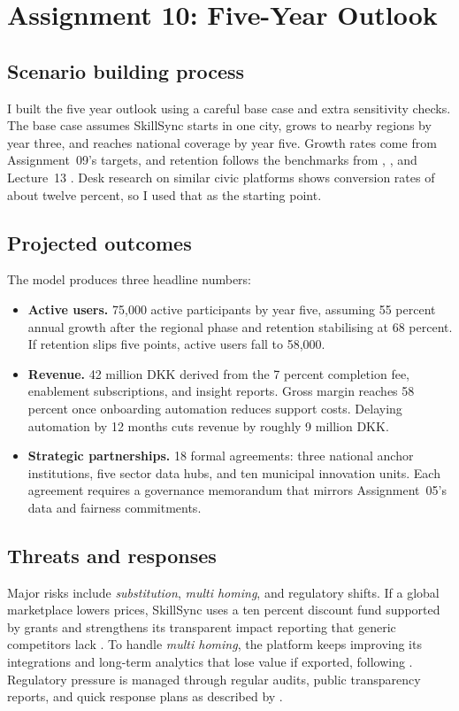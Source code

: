\section*{Assignment 10: Five-Year Outlook}

\subsection*{Scenario building process}
I built the five year outlook using a careful base case and extra sensitivity checks. The base case assumes SkillSync starts in one city, grows to nearby regions by year three, and reaches national coverage by year five. Growth rates come from Assignment~09’s targets, and retention follows the benchmarks from \citet{Choudary2016}, \citet{Srnicek2017}, and Lecture~13 \citep{Lecture13}. Desk research on similar civic platforms shows conversion rates of about twelve percent, so I used that as the starting point.

\subsection*{Projected outcomes}
The model produces three headline numbers:
\begin{itemize}

\item \textbf{Active users.} 75,000 active participants by year five, assuming 55 percent annual growth after the regional phase and retention stabilising at 68 percent. If retention slips five points, active users fall to 58,000.

\item \textbf{Revenue.} 42 million DKK derived from the 7 percent completion fee, enablement subscriptions, and insight reports. Gross margin reaches 58 percent once onboarding automation reduces support costs. Delaying automation by 12 months cuts revenue by roughly 9 million DKK.

\item \textbf{Strategic partnerships.} 18 formal agreements: three national anchor institutions, five sector data hubs, and ten municipal innovation units. Each agreement requires a governance memorandum that mirrors Assignment~05's data and fairness commitments.

\end{itemize}

\subsection*{Threats and responses}
Major risks include \textit{substitution}, \textit{multi homing}, and regulatory shifts. If a global marketplace lowers prices, SkillSync uses a ten percent discount fund supported by grants and strengthens its transparent impact reporting that generic competitors lack \citep{Porter2008}. To handle \textit{multi homing}, the platform keeps improving its integrations and long-term analytics that lose value if exported, following \citet{FarrellSaloner1986}. Regulatory pressure is managed through regular audits, public transparency reports, and quick response plans as described by \citet{Srnicek2017}.

